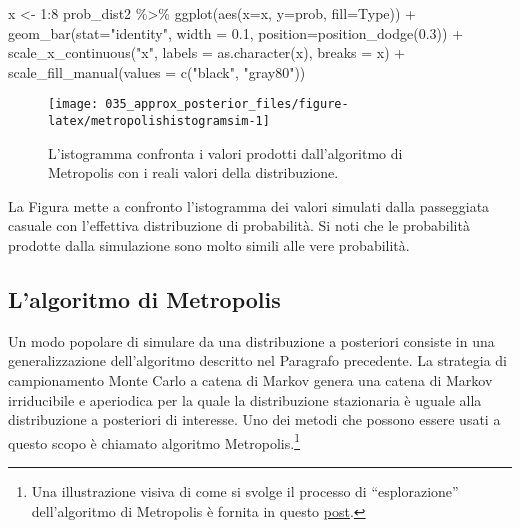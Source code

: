 \documentclass[
]{memoir}
\newenvironment{Shaded}{\begin{snugshade}}{\end{snugshade}}
\newcommand{\AttributeTok}[1]{\textcolor[rgb]{0.77,0.63,0.00}{#1}}
\newcommand{\DecValTok}[1]{\textcolor[rgb]{0.00,0.00,0.81}{#1}}
\newcommand{\FloatTok}[1]{\textcolor[rgb]{0.00,0.00,0.81}{#1}}
\newcommand{\FunctionTok}[1]{\textcolor[rgb]{0.00,0.00,0.00}{#1}}
\newcommand{\NormalTok}[1]{#1}
\newcommand{\OtherTok}[1]{\textcolor[rgb]{0.56,0.35,0.01}{#1}}
\newcommand{\SpecialCharTok}[1]{\textcolor[rgb]{0.00,0.00,0.00}{#1}}
\newcommand{\StringTok}[1]{\textcolor[rgb]{0.31,0.60,0.02}{#1}}
\begin{document}
\begin{Shaded}
\begin{Highlighting}[]
\NormalTok{x }\OtherTok{\textless{}{-}} \DecValTok{1}\SpecialCharTok{:}\DecValTok{8}
\NormalTok{prob\_dist2 }\SpecialCharTok{\%\textgreater{}\%}
  \FunctionTok{ggplot}\NormalTok{(}\FunctionTok{aes}\NormalTok{(}\AttributeTok{x=}\NormalTok{x, }\AttributeTok{y=}\NormalTok{prob, }\AttributeTok{fill=}\NormalTok{Type)) }\SpecialCharTok{+}
  \FunctionTok{geom\_bar}\NormalTok{(}\AttributeTok{stat=}\StringTok{"identity"}\NormalTok{, }\AttributeTok{width =} \FloatTok{0.1}\NormalTok{, }\AttributeTok{position=}\FunctionTok{position\_dodge}\NormalTok{(}\FloatTok{0.3}\NormalTok{)) }\SpecialCharTok{+}
  \FunctionTok{scale\_x\_continuous}\NormalTok{(}\StringTok{"x"}\NormalTok{, }\AttributeTok{labels =} \FunctionTok{as.character}\NormalTok{(x), }\AttributeTok{breaks =}\NormalTok{ x) }\SpecialCharTok{+}
  \FunctionTok{scale\_fill\_manual}\NormalTok{(}\AttributeTok{values =} \FunctionTok{c}\NormalTok{(}\StringTok{"black"}\NormalTok{, }\StringTok{"gray80"}\NormalTok{))}
\end{Highlighting}
\end{Shaded}

\begin{figure}

{\centering \texttt{[image: 035\_approx\_posterior\_files/figure-latex/metropolishistogramsim-1]} 

}

\caption{L'istogramma confronta i valori prodotti dall'algoritmo di Metropolis con i reali valori della distribuzione.}\label{fig:metropolishistogramsim}
\end{figure}

\noindent
La Figura mette a confronto l'istogramma dei valori simulati dalla passeggiata casuale con l'effettiva distribuzione di probabilità. Si noti che le probabilità prodotte dalla simulazione sono molto simili alle vere probabilità.

\hypertarget{lalgoritmo-di-metropolis}{%
\subsection{L'algoritmo di Metropolis}\label{lalgoritmo-di-metropolis}}

Un modo popolare di simulare da una distribuzione a posteriori consiste in una generalizzazione dell'algoritmo descritto nel Paragrafo precedente. La strategia di campionamento Monte Carlo a catena di Markov genera una catena di Markov irriducibile e aperiodica per la quale la distribuzione stazionaria è uguale alla distribuzione a posteriori di interesse. Uno dei metodi che possono essere usati a questo scopo è chiamato algoritmo Metropolis.\footnote{Una illustrazione visiva di come si svolge il processo di ``esplorazione'' dell'algoritmo di Metropolis è fornita in questo \href{https://elevanth.org/blog/2017/11/28/build-a-better-markov-chain/}{post}.}
\end{document}
